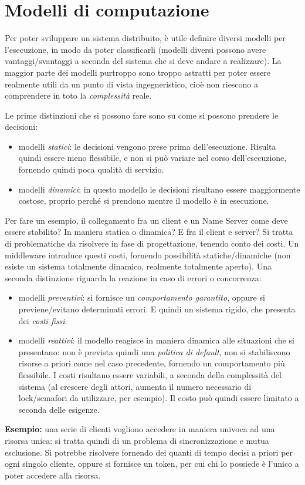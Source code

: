 \chapter{Modelli di computazione}
Per poter sviluppare un sistema distribuito, è utile definire diversi modelli per l'esecuzione, in modo da poter
classificarli (modelli diversi possono avere vantaggi/svantaggi a seconda del sistema che si deve andare a realizzare).
La maggior parte dei modelli purtroppo sono troppo astratti per poter essere realmente utili da un punto di vista
ingegneristico, cioè non riescono a comprendere in toto la \textit{complessità} reale.

Le prime distinzioni che si possono fare sono su come si possono prendere le decisioni:
\begin{itemize}
 \item modelli \textit{statici}: le decisioni vengono prese prima dell'esecuzione. Risulta quindi essere meno
flessibile, e non si può variare nel corso dell'esecuzione, fornendo quindi poca qualità di servizio.
\item modelli \textit{dinamici}: in questo modello le decisioni risultano essere maggiormente costose, proprio perché
si prendono mentre il modello è in esecuzione.
\end{itemize}
Per fare un esempio, il collegamento fra un client e un Name Server come deve essere stabilito? In maniera statica o
dinamica? E fra il client e server? Si tratta di problematiche da risolvere in fase di progettazione, tenendo conto
dei costi. Un middleware introduce questi costi, fornendo possibilità statiche/dinamiche (non esiste un sistema
totalmente dinamico, realmente totalmente aperto).
Una seconda distinzione riguarda la reazione in caso di errori o concorrenza:
\begin{itemize}
 \item modelli \textit{preventivi}: si fornisce un \textit{comportamento garantito}, oppure si previene/evitano
determinati errori. E quindi un sistema rigido, che presenta dei \textit{costi fissi}.
\item modelli \textit{reattivi}: il modello reagisce in maniera dinamica alle situazioni che si presentano: non è
prevista quindi una \textit{politica di default}, non si stabiliscono risorse a priori come nel caso precedente,
fornendo un comportamento più flessibile. I costi risultano essere variabili, a seconda della complessità del sistema
(al crescere degli attori, aumenta il numero necessario di lock/semafori da utilizzare, per esempio). Il costo può
quindi essere limitato a seconda delle esigenze.
\end{itemize}
\textbf{Esempio:} una serie di clienti vogliono accedere in maniera univoca ad
una risorsa unica: si tratta quindi di un problema
di sincronizzazione e mutua esclusione. Si potrebbe risolvere fornendo dei quanti di tempo decisi a priori per ogni
singolo cliente, oppure si fornisce un token, per cui chi lo possiede è l'unico a poter accedere alla risorsa.

